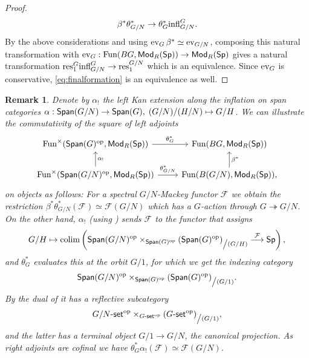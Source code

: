 \documentclass[reqno]{amsart}
\numberwithin{equation}{section}\theoremstyle{thms}
\theoremstyle{defn}
\newtheorem{rem}[equation]{Remark}
\newcommand{\cF}{\mathcal{F}}
\newcommand{\tn}[1]{\textnormal{#1}}
\newcommand{\tsf}[1]{\textsf{\textup{#1}}}
\newcommand{\op}{\tn{op}}
\newcommand{\fun}{\tn{Fun}}
\newcommand{\Mod}{\tsf{Mod}}
\newcommand{\Spans}{\tsf{Span}}
\newcommand{\spec}{\tsf{Sp}}
\newcommand{\gset}{G\tsf{-set}}
\begin{document}
\begin{proof}
\begin{align}\label{eq:finalformation}
\beta^*\theta_{G/N}^* \to \theta_{G}^*\tn{infl}^G_{G/N}.
\end{align}
By the above considerations and using $\tn{ev}_G \, \beta^* \simeq \tn{ev}_{G/N}$, composing this natural transformation with $\tn{ev}_G: \fun(BG,\Mod_R(\spec)) \to \Mod_R(\spec)$ gives a natural transformation $\tn{res}^G_1\tn{infl}^G_{G/N} \to \tn{res}^{G/N}_1$ which is an equivalence. Since $\tn{ev}_G$ is conservative, \ref{eq:finalformation} is an equivalence as well.
\end{proof}

\begin{rem}
Denote by $\alpha_!$ the left Kan extension along the inflation on span categories $\alpha: \Spans(G/N) \to \Spans(G), \; (G/N)/(H/N) \mapsto G/H$. We can illustrate the commutativity of the square of left adjoints
\[\begin{tikzcd}
	{\fun^{\times}(\Spans(G)^{\op},\Mod_R(\spec))} & {\fun(BG,\Mod_R(\spec))} \\
	{\fun^{\times}(\Spans(G/N)^{\op},\Mod_R(\spec))} & {\fun(B(G/N),\Mod_R(\spec)),}
	\arrow["{\theta^*_G}", from=1-1, to=1-2]
	\arrow["{\alpha_!}"', from=2-1, to=1-1]
	\arrow["{\theta_{G/N}^*}", from=2-1, to=2-2]
	\arrow["{\beta^*}"', from=2-2, to=1-2]
\end{tikzcd}\]
on objects as follows: For a spectral $G/N$-Mackey functor $\cF$ we obtain the restriction $\beta^*\theta_{G/N}^*(\cF) \simeq \cF(G/N)$ which has a $G$-action through $G \twoheadrightarrow G/N$. On the other hand, $\alpha_!$ (using \cite[Proposition 3.3.2]{chll24}) sends $\cF$ to the functor that assigns
$$G/H \mapsto \tn{colim}\left(\Spans(G/N)^\op \times_{\Spans(G)^\op} (\Spans(G)^\op)_{\tn{\big /}(G/H)} \stackrel{\cF}{\longrightarrow} \spec \right),$$
and $\theta^*_G$ evaluates this at the orbit $G/1$, for which we get the indexing category 
$$\Spans(G/N)^\op \times_{\Spans(G)^\op} (\Spans(G)^\op)_{\tn{\big /}(G/1)}.$$
By the dual of \cite[{}p.106]{bh21} it has a reflective subcategory
$$G/N\tsf{-set}^\op \times_{\gset^\op} (\gset^\op)_{\tn{\big /}(G/1)},$$
and the latter has a terminal object $G/1 \to G/N$, the canonical projection. As right adjoints are cofinal \cite[Corollary 7.2.3.7]{kerodon} we have $\theta^*_G\alpha_!(\cF) \simeq \cF(G/N)$.
\end{rem}
\end{document}
